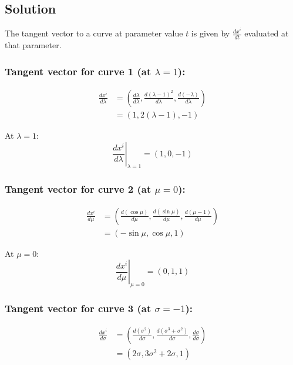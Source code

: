 \documentclass[10pt,twocoloumn]{article}
\begin{document}
\subsection*{Solution}

The tangent vector to a curve at parameter value $t$ is given by $\frac{dx^i}{dt}$ evaluated at that parameter.

\subsubsection*{Tangent vector for curve 1 (at $\lambda = 1$):}

\begin{align*}
\frac{dx^i}{d\lambda} &= \left(\frac{d\lambda}{d\lambda}, \frac{d(\lambda-1)^2}{d\lambda}, \frac{d(-\lambda)}{d\lambda}\right) \\
&= (1, 2(\lambda-1), -1)
\end{align*}

At $\lambda = 1$:
\begin{equation*}
\boxed{\left.\frac{dx^i}{d\lambda}\right|_{\lambda=1} = (1, 0, -1)}
\end{equation*}

\subsubsection*{Tangent vector for curve 2 (at $\mu = 0$):}

\begin{align*}
\frac{dx^i}{d\mu} &= \left(\frac{d(\cos\mu)}{d\mu}, \frac{d(\sin\mu)}{d\mu}, \frac{d(\mu-1)}{d\mu}\right) \\
&= (-\sin\mu, \cos\mu, 1)
\end{align*}

At $\mu = 0$:
\begin{equation*}
\boxed{\left.\frac{dx^i}{d\mu}\right|_{\mu=0} = (0, 1, 1)}
\end{equation*}

\subsubsection*{Tangent vector for curve 3 (at $\sigma = -1$):}

\begin{align*}
\frac{dx^i}{d\sigma} &= \left(\frac{d(\sigma^2)}{d\sigma}, \frac{d(\sigma^3+\sigma^2)}{d\sigma}, \frac{d\sigma}{d\sigma}\right) \\
&= (2\sigma, 3\sigma^2 + 2\sigma, 1)
\end{align*}
\end{document}
